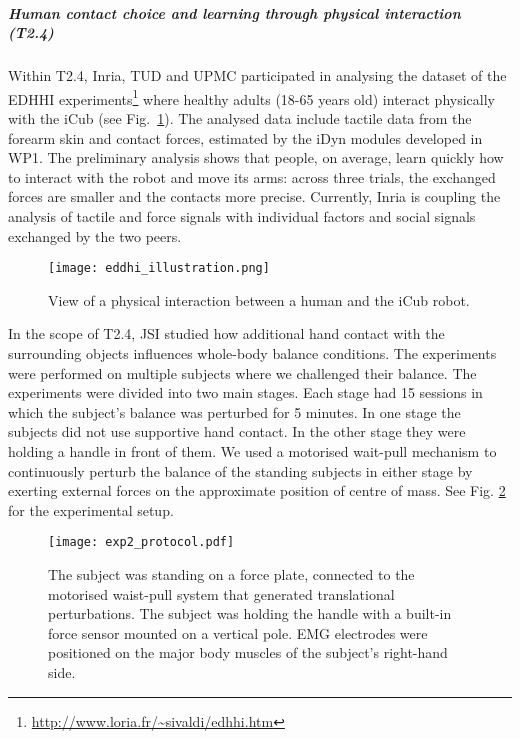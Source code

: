 \subparagraph{Human contact choice and learning through physical interaction (T2.4)}

Within T2.4, Inria, TUD and UPMC participated in analysing the dataset of the EDHHI experiments\footnote{\url{http://www.loria.fr/~sivaldi/edhhi.htm}} where healthy adults (18-65 years old) interact physically with the iCub (see  Fig.~\ref{fig:eddhi_picture}). The analysed data include tactile data from the forearm skin and contact forces, estimated by the iDyn modules developed in WP1. The preliminary analysis shows that people, on average, learn quickly how to interact with the robot and move its arms: across three trials, the exchanged forces are smaller and the contacts more precise. Currently, Inria is coupling the analysis of tactile and force signals with individual factors and social signals exchanged by the two peers.

\begin{figure}[!t]
  \centering
  \texttt{[image: eddhi\_illustration.png]}
  \caption{View of a physical interaction between a human and the iCub robot.}
  \label{fig:eddhi_picture}
\end{figure}

In the scope of T2.4, JSI studied how additional hand contact with the surrounding objects influences whole-body balance conditions. The experiments were performed on multiple subjects where we challenged their balance. The experiments were divided into two main stages. Each stage had 15 sessions in which the subject's balance was perturbed for 5 minutes. In one stage the subjects did not use supportive hand contact. In the other stage they were holding a handle in front of them. We used a motorised wait-pull mechanism \cite{Peternel2013} to continuously perturb the balance of the standing subjects in either stage by exerting external forces on the approximate position of centre of mass. See Fig. \ref{fig:exp2_protocol} for the experimental setup.

\begin{figure}[!t]
	\begin{center}
		\texttt{[image: exp2\_protocol.pdf]}
		\caption{The subject was standing on a force plate, connected to the motorised waist-pull system that generated translational perturbations. The subject was holding the handle with a built-in force sensor mounted on a vertical pole. EMG electrodes were positioned on the major body muscles of the subject's right-hand side.}
		\label{fig:exp2_protocol}
	\end{center}
\end{figure}

